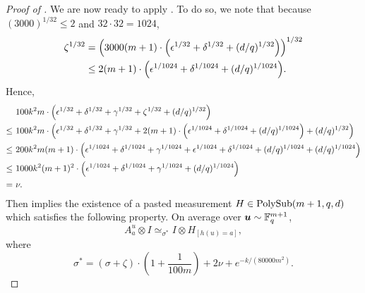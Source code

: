 \begin{proof}[Proof of ]
We are now ready to apply .
To do so, we note that because $(3000)^{1/32} \leq 2$
and $32 \cdot 32 = 1024$,
\begin{align*}
\zeta^{1/32}
&= \Big(3000 (m+1) \cdot \Big(\epsilon^{1/32} + \delta^{1/32} + (d/q)^{1/32}\Big)\Big)^{1/32}\\
&\leq 2 (m+1) \cdot \Big(\epsilon^{1/1024} + \delta^{1/1024} + (d/q)^{1/1024}\Big).
\end{align*}
Hence,
\begin{align*}
&100 k^2m \cdot \left(\epsilon^{1/32} + \delta^{1/32} + \gamma^{1/32} + \zeta^{1/32} + (d/q)^{1/32}\right)\\
\leq~&100 k^2m \cdot \left(\epsilon^{1/32} + \delta^{1/32} + \gamma^{1/32} + 2 (m+1) \cdot \Big(\epsilon^{1/1024} + \delta^{1/1024} + (d/q)^{1/1024}\Big)+ (d/q)^{1/32}\right)\\
\leq~& 200 k^2 m(m+1) \cdot\left(\epsilon^{1/1024} + \delta^{1/1024} + \gamma^{1/1024} + \epsilon^{1/1024} + \delta^{1/1024} + (d/q)^{1/1024}+ (d/q)^{1/1024}\right)\\
\leq~& 1000 k^2 (m+1)^2 \cdot\left(\epsilon^{1/1024} + \delta^{1/1024} + \gamma^{1/1024} + (d/q)^{1/1024}\right)\\
=~& \nu.
\end{align*}
Then  implies the existence of a
pasted measurement $H \in \mathrm{PolySub}(m+1, q, d)$ which satisfies the following
property.
On average over $\boldsymbol{u} \sim \mathbb F_q^{m+1}$,
\begin{equation*}
  A^{u}_a \otimes I \simeq_{\sigma^*} I \otimes H_{[h(u)=a]},
\end{equation*}
where
\begin{equation*}
  \sigma^* = (\sigma + \zeta) \cdot \left(1 + \frac{1}{100m}\right)
  + 2\nu + e^{- k/(80000m^2)}.
\end{equation*}
	  


\end{proof}

